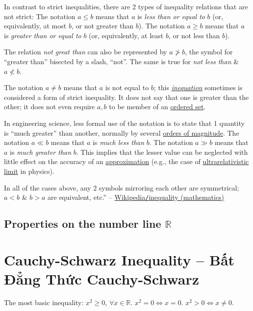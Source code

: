 \documentclass{article}
\begin{document}
In contrast to strict inequalities, there are 2 types of inequality relations that are not strict: The notation $a\le b$ means that $a$ is \textit{less than or equal to} $b$ (or, equivalently, at most $b$, or not greater than $b$). The notation $a\ge b$ means that $a$ is \textit{greater than or equal to} $b$ (or, equivalently, at least $b$, or not less than $b$).

The relation \textit{not great than} can also be represented by $a\not > b$, the symbol for ``greater than'' bisected by a slash, ``not''. The same is true for \textit{not less than} \& $a\not < b$.

The notation $a\ne b$ means that $a$ is not equal to $b$; this \href{https://en.wikipedia.org/wiki/Inequation}{\textit{inequation}} sometimes is considered a form of strict inequality. It does not say that one is greater than the other; it does not even require $a,b$  to be member of an \href{https://en.wikipedia.org/wiki/Ordered_set}{ordered set}.

In engineering science, less formal use of the notation is to state that 1 quantity is ``much greater'' than another, normally by several \href{https://en.wikipedia.org/wiki/Order_of_magnitude}{orders of magnitude}. The notation $a\ll b$ means that $a$ is \textit{much less than} $b$. The notation $a\gg b$ means that $a$ is \textit{much greater than} $b$. This implies that the lesser value can be neglected with little effect on the accuracy of an \href{https://en.wikipedia.org/wiki/Approximation}{approximation} (e.g., the case of \href{https://en.wikipedia.org/wiki/Ultrarelativistic_limit}{ultrarelativistic limit} in physics).

In all of the cases above, any 2 symbols mirroring each other are symmetrical; $a < b$ \& $b > a$ are equivalent, etc.'' -- \href{https://en.wikipedia.org/wiki/Inequality_(mathematics)}{Wikipedia\texttt{/}inequality (mathematics)}

\subsection{Properties on the number line $\mathbb{R}$}



\section{Cauchy-Schwarz Inequality -- Bất Đẳng Thức Cauchy-Schwarz}
The most basic inequality: $x^2\ge0$, $\forall x\in\mathbb{R}$. $x^2 = 0\Leftrightarrow x = 0$. $x^2 > 0\Leftrightarrow x\ne0$.
\end{document}
